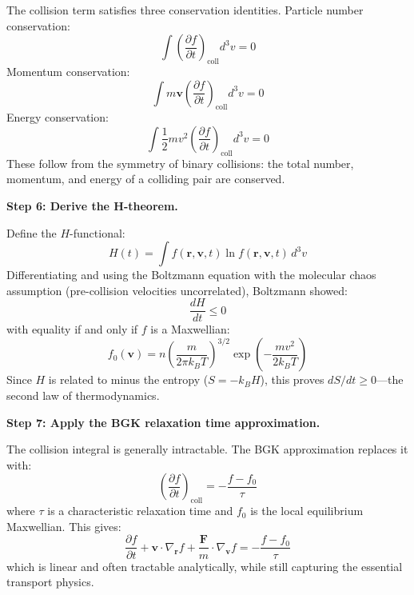 \documentclass[11pt,openright]{book}
\begin{document}
The collision term satisfies three conservation identities. Particle number conservation:
\begin{equation}
\int\left(\frac{\partial f}{\partial t}\right)_{\text{coll}}d^3v = 0
\end{equation}
Momentum conservation:
\begin{equation}
\int m\mathbf{v}\left(\frac{\partial f}{\partial t}\right)_{\text{coll}}d^3v = 0
\end{equation}
Energy conservation:
\begin{equation}
\int\frac{1}{2}mv^2\left(\frac{\partial f}{\partial t}\right)_{\text{coll}}d^3v = 0
\end{equation}
These follow from the symmetry of binary collisions: the total number, momentum, and energy of a colliding pair are conserved.

\textbf{Step 6: Derive the H-theorem.}

Define the $H$-functional:
\begin{equation}
H(t) = \int f(\mathbf{r},\mathbf{v},t)\ln f(\mathbf{r},\mathbf{v},t)\,d^3v
\end{equation}
Differentiating and using the Boltzmann equation with the molecular chaos assumption (pre-collision velocities uncorrelated), Boltzmann showed:
\begin{equation}
\frac{dH}{dt} \leq 0
\end{equation}
with equality if and only if $f$ is a Maxwellian:
\begin{equation}
f_0(\mathbf{v}) = n\left(\frac{m}{2\pi k_BT}\right)^{3/2}\exp\left(-\frac{mv^2}{2k_BT}\right)
\end{equation}
Since $H$ is related to minus the entropy ($S = -k_B H$), this proves $dS/dt \geq 0$---the second law of thermodynamics.

\textbf{Step 7: Apply the BGK relaxation time approximation.}

The collision integral is generally intractable. The BGK approximation replaces it with:
\begin{equation}
\left(\frac{\partial f}{\partial t}\right)_{\text{coll}} = -\frac{f - f_0}{\tau}
\end{equation}
where $\tau$ is a characteristic relaxation time and $f_0$ is the local equilibrium Maxwellian. This gives:
\begin{equation}
\frac{\partial f}{\partial t} + \mathbf{v}\cdot\nabla_{\mathbf{r}} f + \frac{\mathbf{F}}{m}\cdot\nabla_{\mathbf{v}} f = -\frac{f - f_0}{\tau}
\end{equation}
which is linear and often tractable analytically, while still capturing the essential transport physics.
\end{document}

